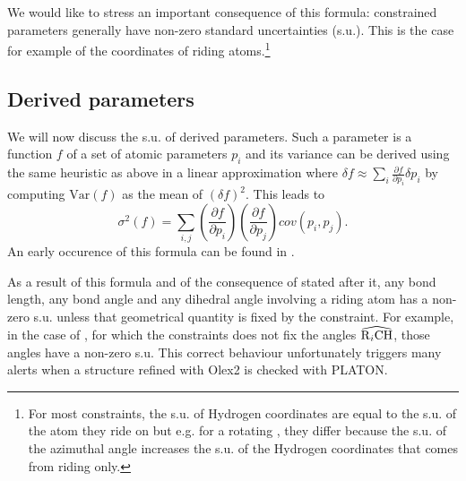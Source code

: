 \documentclass[pdf]{iucr}
\newcommand{\var}[1]{\mathrm{Var}\left(#1\right)}
\newcommand{\partialder}[2]{\frac{\partial #1}{\partial #2}}
\begin{document}
We would like to stress an important consequence of this formula: constrained parameters generally have non-zero standard uncertainties (s.u.). This is the case for example of the coordinates of riding atoms.\footnote{For most constraints, the s.u. of Hydrogen coordinates are equal to the s.u. of the atom they ride on but e.g. for a rotating , they differ because the s.u. of the azimuthal angle increases the s.u. of the Hydrogen coordinates that comes from riding only.} 

\subsection{Derived parameters}

We will now discuss the s.u. of derived parameters. Such a parameter is a function $f$ of a set of atomic parameters $p_i$ and its variance can be derived using the same heuristic as above in a linear approximation where $\delta f \approx \sum_i \partialder{f}{p_i} \delta p_i$ by computing $\var{f}$ as the mean of $(\delta f)^2$. This leads to
\begin{equation}
\sigma^2(f) = \sum_{i,j}{\left(\partialder{f}{p_i}\right) \left(\partialder{f}{p_j}\right) cov(p_i,p_j)}.
\label{eqn:sigma_f}
\end{equation}
An early occurence of this formula can be found in .

As a result of this formula and of the consequence of  stated after it, any bond length, any bond angle and any dihedral angle involving a riding atom has a non-zero s.u. unless that geometrical quantity is fixed by the constraint. For example, in the case of , for which the constraints does not fix the angles $\widehat{\ce{R$_i$CH}}$, those angles have a non-zero s.u. This correct behaviour unfortunately triggers many alerts when a structure refined with Olex2 is checked with PLATON. 
\end{document}

